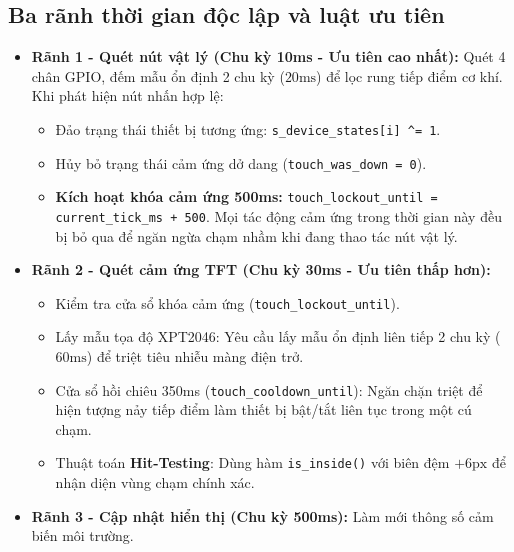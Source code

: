 \documentclass[11pt,a4paper]{article}
\begin{document}
\subsection{Ba rãnh thời gian độc lập và luật ưu tiên}
\begin{itemize}
    \item \textbf{Rãnh 1 - Quét nút vật lý (Chu kỳ 10ms - Ưu tiên cao nhất):} Quét 4 chân GPIO, đếm mẫu ổn định 2 chu kỳ ($20\text{ms}$) để lọc rung tiếp điểm cơ khí. Khi phát hiện nút nhấn hợp lệ:
    \begin{itemize}
        \item Đảo trạng thái thiết bị tương ứng: \texttt{s\_device\_states[i] \^{}= 1}.
        \item Hủy bỏ trạng thái cảm ứng dở dang (\texttt{touch\_was\_down = 0}).
        \item \textbf{Kích hoạt khóa cảm ứng 500ms:} \texttt{touch\_lockout\_until = current\_tick\_ms + 500}. Mọi tác động cảm ứng trong thời gian này đều bị bỏ qua để ngăn ngừa chạm nhầm khi đang thao tác nút vật lý.
    \end{itemize}
    \item \textbf{Rãnh 2 - Quét cảm ứng TFT (Chu kỳ 30ms - Ưu tiên thấp hơn):} 
    \begin{itemize}
        \item Kiểm tra cửa sổ khóa cảm ứng (\texttt{touch\_lockout\_until}).
        \item Lấy mẫu tọa độ XPT2046: Yêu cầu lấy mẫu ổn định liên tiếp 2 chu kỳ ($60\text{ms}$) để triệt tiêu nhiễu màng điện trở.
        \item Cửa sổ hồi chiêu 350ms (\texttt{touch\_cooldown\_until}): Ngăn chặn triệt để hiện tượng nảy tiếp điểm làm thiết bị bật/tắt liên tục trong một cú chạm.
        \item Thuật toán \textbf{Hit-Testing}: Dùng hàm \texttt{is\_inside()} với biên đệm $+6\text{px}$ để nhận diện vùng chạm chính xác.
    \end{itemize}
    \item \textbf{Rãnh 3 - Cập nhật hiển thị (Chu kỳ 500ms):} Làm mới thông số cảm biến môi trường.
\end{itemize}
\end{document}
